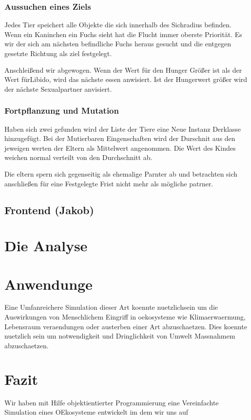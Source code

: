 \documentclass[12pt]{article}
\begin{document}
\subsubsection{Aussuchen eines Ziels}
Jedes Tier speichert alle Objekte die sich innerhalb des Sichradius befinden.
Wenn ein Kaninchen ein Fuchs sieht hat die Flucht immer oberste Priorität.
Es wir der sich am nächsten befindliche Fuchs heraus gesucht und die entgegen gesetzte Richtung als ziel festgelegt.

Anschleißend wir abgewogen.
Wenn der Wert für den Hunger Größer ist als der Wert fürLibido, wird das nächste essen anwisiert.
Ist der Hungerwert größer wird der nächste Sexualpartner anvisiert.
\subsubsection{Fortpflanzung und Mutation}
Haben sich zwei gefunden wird der Liste der Tiere eine Neue Instanz Derklasse hinzugefügt.
Bei der Mutierbaren Eingenschaften wird der Durschnit aus den jeweigen werten der Eltern als Mittelwert angenommen.
Die Wert des Kindes weichen normal verteilt von den Durchschnitt ab.

Die eltern spern sich gegenseitig als ehemalige Parnter ab und betrachten sich anschließen für eine Festgelegte Frist nicht mehr als mögliche patrner.

\subsection{Frontend (Jakob)}
\section{Die Analyse}

\section{Anwendunge}
Eine Umfanreichere Simulation dieser Art koennte nuetzlichsein um die Auswirkungen von Menschlichem Eingriff in oekosysteme wie Klimaerwaermung, Lebensraum veraendungen oder austerben einer Art abzuschaetzen.
Dies koennte nuetzlich sein um notwendigkeit und Dringlichkeit von Umwelt Massnahmem abzuschaetzen.
\section{Fazit}
Wir haben mit Hilfe objektientierter Programmierung eine Vereinfachte Simulation eines OEkosysteme entwickelt im dem wir uns auf 
\end{document}
